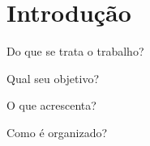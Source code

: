 
\chapter{Introdução}
\label{chap:introducao}

Do que se trata o trabalho?

Qual seu objetivo?

O que acrescenta?

Como é organizado?


